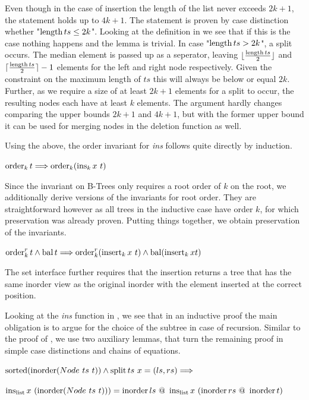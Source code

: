 Even though in the case of insertion the length of the list
never exceeds $2k+1$, the statement holds up to $4k+1$.
The statement is proven by case distinction whether "$\operatorname{length} ts \le 2k$".
Looking at the definition in 
we see that if this is the case nothing happens and the lemma is trivial.
In case "$\operatorname{length} ts > 2k$", a split occurs.
The median element is passed up as a seperator, leaving
$\lfloor\frac{\operatorname{length} ts}{2}\rfloor$ and $\lceil\frac{\operatorname{length} ts}{2}\rceil - 1$
elements for the left and right node respectively.
Given the constraint on the maximum length of $ts$
this will always be below or equal $2k$.
Further, as we require a size of at least $2k+1$ elements for a split to occur,
the resulting nodes each have at least $k$ elements.
The argument hardly changes comparing the upper bounds $2k+1$ and $4k+1$,
but with the former upper bound it can be used for merging nodes
in the deletion function as well.

Using the above, the order invariant for \textit{ins}
follows quite directly by induction.

\begin{lemma}
    $\operatorname{order}_k t \Longrightarrow \operatorname{order}_k (\operatorname{ins}_k x\ t)$
\end{lemma}

Since the invariant on B-Trees only requires a root order of $k$ on the
root, we additionally derive versions of the invariants
for root order.
They are straightforward however as all trees in the inductive case
have order $k$, for which preservation was already proven.
Putting things together, we obtain preservation of the invariants.

\begin{theorem}
    \label{thm:ins-invar}
    $\operatorname{order}^r_k t \wedge \operatorname{bal} t \Longrightarrow
    \operatorname{order}^r_k (\operatorname{insert}_k x\ t) \wedge \operatorname{bal} (\operatorname{insert}_k x t)$
\end{theorem}


The set interface further requires that the insertion returns a tree
that has the same inorder view as the original inorder with the element
inserted at the correct position.

Looking at the \textit{ins} function in ,
we see that in an inductive proof the main obligation
is to argue for the choice of the subtree in case of recursion.
Similar to the proof of ,
we use two auxiliary lemmas, that turn the remaining
proof in simple case distinctions and chains of equations.

\begin{lemma}
    $\operatorname{sorted}(\operatorname{inorder} (Node\ ts\ t)) \wedge \operatorname{split} ts\ x = (ls, rs) \Longrightarrow$ \\
    \begin{center}
    $\operatorname{ins_{list}} x\ (\operatorname{inorder} (Node\ ts\ t))) = \operatorname{inorder} ls\ @\ \operatorname{ins_{list}} x\ (\operatorname{inorder} rs\ @\ \operatorname{inorder} t)$
    \end{center}
\end{lemma}

